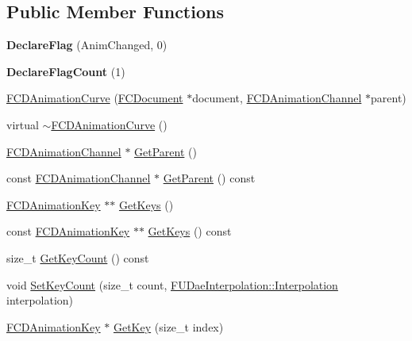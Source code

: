 \subsection*{Public Member Functions}
\begin{DoxyCompactItemize}
\item 
\hypertarget{classFCDAnimationCurve_a66c2b001d6172d74e57899d965449a7a}{
{\bfseries DeclareFlag} (AnimChanged, 0)}
\label{classFCDAnimationCurve_a66c2b001d6172d74e57899d965449a7a}

\item 
\hypertarget{classFCDAnimationCurve_abb88a31deb0a9ee93279240b24b3947d}{
{\bfseries DeclareFlagCount} (1)}
\label{classFCDAnimationCurve_abb88a31deb0a9ee93279240b24b3947d}

\item 
\hyperlink{classFCDAnimationCurve_ab266e817fd27a881f02c30d18b5c5f72}{FCDAnimationCurve} (\hyperlink{classFCDocument}{FCDocument} $\ast$document, \hyperlink{classFCDAnimationChannel}{FCDAnimationChannel} $\ast$parent)
\item 
virtual \hyperlink{classFCDAnimationCurve_a505ad851cb7265a300a5342996dd8c84}{$\sim$FCDAnimationCurve} ()
\item 
\hyperlink{classFCDAnimationChannel}{FCDAnimationChannel} $\ast$ \hyperlink{classFCDAnimationCurve_a7913003ec78d23d6e8b42feb17b943d4}{GetParent} ()
\item 
const \hyperlink{classFCDAnimationChannel}{FCDAnimationChannel} $\ast$ \hyperlink{classFCDAnimationCurve_a3e9c80bfc5bf390d79a511687d77f4fa}{GetParent} () const 
\item 
\hyperlink{classFCDAnimationKey}{FCDAnimationKey} $\ast$$\ast$ \hyperlink{classFCDAnimationCurve_acb8c98803d2cd6df5912c53aeb9b18f6}{GetKeys} ()
\item 
const \hyperlink{classFCDAnimationKey}{FCDAnimationKey} $\ast$$\ast$ \hyperlink{classFCDAnimationCurve_a0f4684cb8a2fd9119f294f91697da7bc}{GetKeys} () const 
\item 
size\_\-t \hyperlink{classFCDAnimationCurve_a3bbe5d298465ab1679f0236831d88369}{GetKeyCount} () const 
\item 
void \hyperlink{classFCDAnimationCurve_afa4134d2d93011191686d5dc7bd2f69f}{SetKeyCount} (size\_\-t count, \hyperlink{namespaceFUDaeInterpolation_a209a941c2fb6ece1325352968aa0374f}{FUDaeInterpolation::Interpolation} interpolation)
\item 
\hyperlink{classFCDAnimationKey}{FCDAnimationKey} $\ast$ \hyperlink{classFCDAnimationCurve_a4354985b1d74fc5fc006fc2bb853395f}{GetKey} (size\_\-t index)

\end{DoxyCompactItemize}
